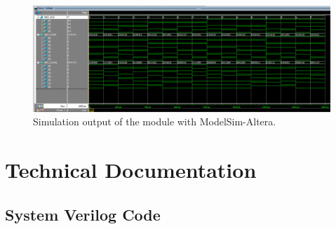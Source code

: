 \documentclass[11pt]{article}
\begin{document}
\begin{figure}[h!]
\centering
\includegraphics[scale=0.54, angle=90]{wave.png}
\caption{Simulation output of the module with ModelSim-Altera.}
\label{figure:wave}
\end{figure} 


\clearpage


\section{Technical Documentation}

\subsection{System Verilog Code}
\end{document}
